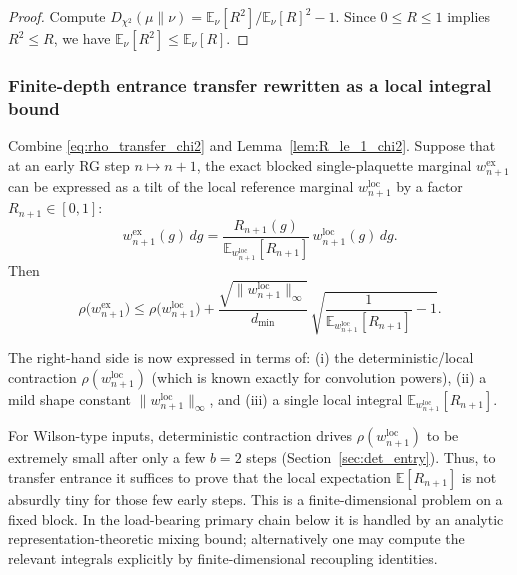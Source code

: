 \begin{proof}
Compute
$D_{\chi^2}(\mu\|\nu)=\mathbb E_{\nu}[R^2]/\mathbb E_{\nu}[R]^2-1$.
Since $0\le R\le 1$ implies $R^2\le R$, we have $\mathbb E_{\nu}[R^2]\le \mathbb E_{\nu}[R]$.
\end{proof}

\subsubsection{Finite-depth entrance transfer rewritten as a local integral bound}

Combine \eqref{eq:rho_transfer_chi2} and Lemma~\ref{lem:R_le_1_chi2}.
Suppose that at an early RG step $n\mapsto n+1$, the exact blocked single-plaquette marginal
$w_{n+1}^{\mathrm{ex}}$ can be expressed as a tilt of the local reference marginal $w_{n+1}^{\mathrm{loc}}$ by
a factor $R_{n+1}\in[0,1]$:
\begin{equation}\label{eq:tilt_assumption}
 w_{n+1}^{\mathrm{ex}}(g)\,dg
=
\frac{R_{n+1}(g)}{\mathbb E_{w_{n+1}^{\mathrm{loc}}}[R_{n+1}]}
\,w_{n+1}^{\mathrm{loc}}(g)\,dg.
\end{equation}
Then
\begin{equation}\label{eq:rho_transfer_ER}
\rho\bigl(w_{n+1}^{\mathrm{ex}}\bigr)
\le
\rho\bigl(w_{n+1}^{\mathrm{loc}}\bigr)
+
\frac{\sqrt{\|w_{n+1}^{\mathrm{loc}}\|_{\infty}}}{d_{\min}}\,
\sqrt{\frac{1}{\mathbb E_{w_{n+1}^{\mathrm{loc}}}[R_{n+1}]}-1}.
\end{equation}

\begin{remark}
The right-hand side is now expressed in terms of:
(i) the deterministic/local contraction $\rho(w_{n+1}^{\mathrm{loc}})$ (which is known exactly for convolution powers),
(ii) a mild shape constant $\|w_{n+1}^{\mathrm{loc}}\|_{\infty}$, and
(iii) a single local integral $\mathbb E_{w_{n+1}^{\mathrm{loc}}}[R_{n+1}]$.

For Wilson-type inputs, deterministic contraction drives $\rho(w_{n+1}^{\mathrm{loc}})$ to be extremely small after
only a few $b=2$ steps (Section~\ref{sec:det_entry}).
Thus, to transfer entrance it suffices to prove that the local expectation
$\mathbb E[R_{n+1}]$ is not absurdly tiny for those few early steps.
This is a finite-dimensional problem on a fixed block.
In the load-bearing primary chain below it is handled by an analytic representation-theoretic mixing bound;
alternatively one may compute the relevant integrals explicitly by finite-dimensional recoupling identities.
\end{remark}

